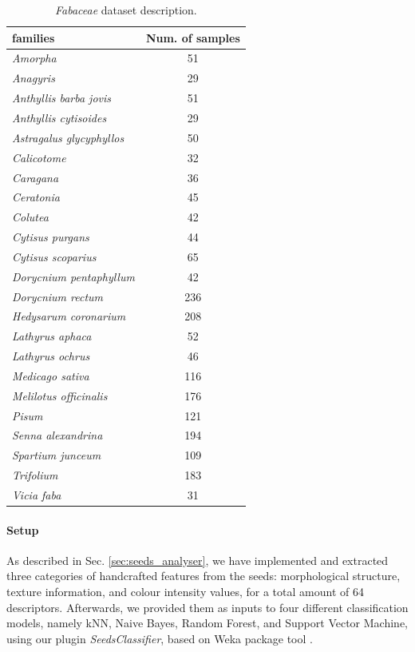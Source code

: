 \documentclass[twocolumn]{svjour3}           %
\begin{document}
\begin{table}[htbp]
	\centering
	\small
	\hspace{0.05cm}
	\begin{tabular}{lc}
		\hline
		\textbf{families} & \textbf{Num. of samples} \\
		\hline
		\emph{Amorpha} & 51 \\
		\emph{Anagyris} & 29 \\
		\emph{Anthyllis barba jovis} & 51 \\
		\emph{Anthyllis cytisoides} & 29 \\
		\emph{Astragalus glycyphyllos} & 50 \\
		\emph{Calicotome} & 32 \\
		\emph{Caragana} & 36 \\
		\emph{Ceratonia} & 45 \\
		\emph{Colutea} & 42 \\
		\emph{Cytisus purgans} & 44 \\
		\emph{Cytisus scoparius} & 65 \\
		\emph{Dorycnium pentaphyllum} & 42 \\
		\emph{Dorycnium rectum} & 236 \\
		\emph{Hedysarum coronarium} & 208 \\
		\emph{Lathyrus aphaca} & 52 \\
		\emph{Lathyrus ochrus} & 46 \\
		\emph{Medicago sativa} & 116 \\
		\emph{Melilotus officinalis} & 176 \\
		\emph{Pisum} & 121 \\
		\emph{Senna alexandrina} & 194 \\
		\emph{Spartium junceum} & 109  \\
		\emph{Trifolium} & 183 \\
		\emph{Vicia faba} & 31 \\
		\hline
	\end{tabular}
	\caption{\emph{Fabaceae} dataset description.} 
	\label{Sardinia_tab}
\end{table}

\paragraph{Setup}
\label{par:setup}
As described in Sec. \ref{sec:seeds_analyser}, we have implemented and extracted three categories of handcrafted features from the seeds: morphological structure, texture information, and colour intensity values, for a total amount of 64 descriptors. Afterwards, we provided them as inputs to four different classification models, namely kNN, Naive Bayes, Random Forest, and Support Vector Machine, using our plugin \emph{SeedsClassifier}, based on Weka package tool \cite{Weka}. 
\end{document}
